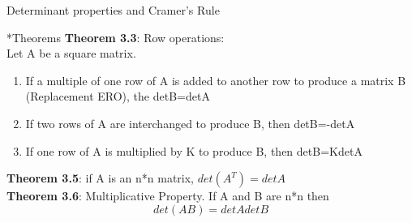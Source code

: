 \documentclass[a4paper, 12pt]{article}
\begin{document}
\newpage
\begin{section}{Determinant properties and Cramer's Rule}
\begin{subsection}*{Theorems}
\textbf{Theorem 3.3}: Row operations:\\
Let A be a square matrix. 
\begin{enumerate}
\item{If a multiple of one row of A is added to another row to produce
a matrix B (Replacement ERO), the detB=detA}
\item{If two rows of A are interchanged to produce B, then detB=-detA}
\item{If one row of A is multiplied by K to produce B, then detB=KdetA}
\end{enumerate}
\textbf{Theorem 3.5}: if A is an n*n matrix, $det(A^{T})=detA$\\
\noindent\textbf{Theorem 3.6}: Multiplicative Property. If A and B are n*n
then
\begin{equation}
det(AB)=detAdetB
\end{equation}


\end{subsection}
\end{section}
\end{document}
